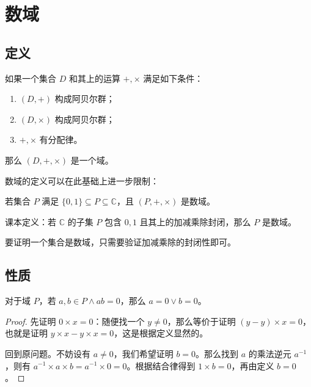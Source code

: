 \section{数域}

\subsection{定义}

\begin{definition}[域的定义]
	如果一个集合 $D$ 和其上的运算 $+,\times$ 满足如下条件：

	\begin{enumerate}
		\item $(D,+)$ 构成阿贝尔群；
		\item $(D,\times)$ 构成阿贝尔群；
		\item $+,\times$ 有分配律。
	\end{enumerate}

	那么 $(D,+,\times)$ 是一个域。
\end{definition}

数域的定义可以在此基础上进一步限制：

\begin{definition}[数域的定义]
	若集合 $P$ 满足 $\{0,1\} \subseteq P \subseteq \mathbb{C}$，且 $(P,+,\times)$ 是数域。

	课本定义：若 $\mathbb{C}$ 的子集 $P$ 包含 $0,1$ 且其上的加减乘除封闭，那么 $P$ 是数域。
\end{definition}

要证明一个集合是数域，只需要验证加减乘除的封闭性即可。

\subsection{性质}

\begin{conclusion}
	对于域 $P$，若 $a,b \in P \land ab=0$，那么 $a=0 \lor b=0$。

	\begin{proof}
		先证明 $0 \times x=0$：随便找一个 $y \neq 0$，那么等价于证明 $(y-y) \times x=0$，也就是证明 $y \times x-y \times x=0$，这是根据定义显然的。

		回到原问题。不妨设有 $a \neq 0$，我们希望证明 $b=0$。那么找到 $a$ 的乘法逆元 $a^{-1}$，则有 $a^{-1} \times a \times b=a^{-1} \times 0=0$。根据结合律得到 $1 \times b=0$，再由定义 $b=0$。
	\end{proof}
\end{conclusion}


